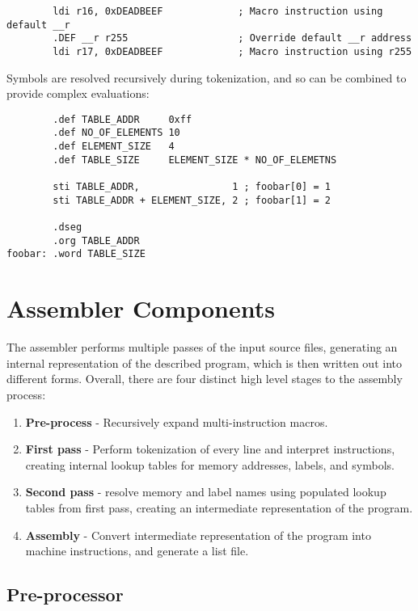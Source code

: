 \documentclass[12pt,twoside]{report}
\begin{document}
\begin{verbatim}
        ldi r16, 0xDEADBEEF             ; Macro instruction using default __r
        .DEF __r r255                   ; Override default __r address
        ldi r17, 0xDEADBEEF             ; Macro instruction using r255
\end{verbatim}

Symbols are resolved recursively during tokenization, and so can be
combined to provide complex evaluations:

\begin{verbatim}
        .def TABLE_ADDR     0xff
        .def NO_OF_ELEMENTS 10
        .def ELEMENT_SIZE   4
        .def TABLE_SIZE     ELEMENT_SIZE * NO_OF_ELEMETNS

        sti TABLE_ADDR,                1 ; foobar[0] = 1
        sti TABLE_ADDR + ELEMENT_SIZE, 2 ; foobar[1] = 2

        .dseg
        .org TABLE_ADDR
foobar: .word TABLE_SIZE
\end{verbatim}

\chapter{Assembler Components}

The assembler performs multiple passes of the input source files,
generating an internal representation of the described program, which
is then written out into different forms. Overall, there are four
distinct high level stages to the assembly process:

\begin{enumerate}
\item \textbf{Pre-process} - Recursively expand multi-instruction macros.
\item \textbf{First pass} - Perform tokenization of every line and
  interpret instructions, creating internal lookup tables for memory
  addresses, labels, and symbols.
\item \textbf{Second pass} - resolve memory and label names using
  populated lookup tables from first pass, creating an intermediate
  representation of the program.
\item \textbf{Assembly} - Convert intermediate representation of the
  program into machine instructions, and generate a list file.
\end{enumerate}

\section{Pre-processor}
\end{document}
